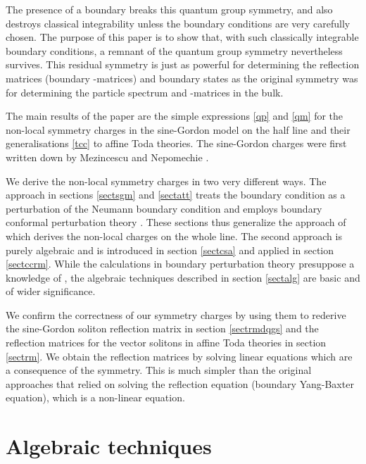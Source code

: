 \documentclass[a4paper,12pt]{article}
\numberwithin{equation}{section}
\begin{document}
The presence of a boundary breaks this quantum group symmetry, and
also destroys classical integrability unless the boundary
conditions are very carefully chosen. The purpose of this paper is
to show that, with such classically integrable boundary
conditions, a remnant of the quantum group symmetry nevertheless
survives. This residual symmetry is just as powerful for
determining the reflection matrices (boundary \coordHE{}-matrices) and
boundary states as the original symmetry was for determining the
particle spectrum and \coordHE{}-matrices in the bulk.

The main results of the paper are the simple expressions
\eqref{qp} and \eqref{qm} for the non-local symmetry charges in
the sine-Gordon model on the half line and their generalisations
\eqref{tcc} to \coordHE{} affine Toda theories. The sine-Gordon
charges were first written down by Mezincescu and Nepomechie
\cite{Mez98}.

We derive the non-local symmetry charges in two very different
ways. The approach in sections \ref{sectsgm} and \ref{sectatt}
treats the boundary condition as a perturbation of the Neumann
boundary condition and employs boundary conformal perturbation
theory \cite{Gho94}. These sections thus generalize the approach
of \cite{Ber91} which derives the non-local charges on the whole
line. The second approach is purely algebraic and is introduced in
section \ref{sectcsa} and applied in section \ref{sectccrm}. While
the calculations in boundary perturbation theory presuppose a
knowledge of \cite{Ber91}, the algebraic techniques described in
section \ref{sectalg} are basic and of wider significance.


We confirm the correctness of our symmetry charges by using them
to rederive the sine-Gordon soliton reflection matrix \cite{Gho94}
in section \ref{sectrmdqgs} and the reflection matrices for the
vector solitons in \coordHE{} affine Toda theories \cite{Gan99b}
in section \ref{sectrm}. We obtain the reflection matrices by
solving linear equations which are a consequence of the symmetry.
This is much simpler than the original approaches that relied on
solving the reflection equation \cite{Che84} (boundary Yang-Baxter
equation), which is a non-linear equation.





\section{Algebraic techniques\label{sectalg}}
\end{document}
